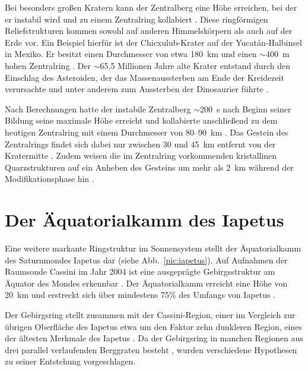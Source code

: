 \documentclass[a4paper,11pt]{article}
\newcommand{\mysection}[1]{\section{#1}\label{sec:#1}}
\begin{document}
Bei besonders großen Kratern kann der Zentralberg eine Höhe erreichen, bei der er instabil wird und
zu einem Zentralring kollabiert \parencite[115]{Rae_2018}.
Diese ringförmigen Reliefstrukturen kommen sowohl auf anderen Himmelskörpern als auch auf der Erde vor.
Ein Beispiel hierfür ist der Chicxulub-Krater auf der Yucatán-Halbinsel in Mexiko.
Er besitzt einen Durchmesser von etwa 180~km und einen $\sim$400~m hohen Zentralring \parencite[100]{Rae_2018}.
Der $\sim$65,5 Millionen Jahre alte Krater entstand durch
den Einschlag des Asteroiden, der das Massenaussterben am Ende der Kreidezeit verursachte und
unter anderem zum Aussterben der Dinosaurier führte \parencite[1214]{Schulte_2010}.

Nach Berechnungen hatte der instabile Zentralberg $\sim$200~s nach Beginn seiner Bildung seine maximale Höhe erreicht und
kollabierte anschließend zu dem heutigen Zentralring mit einem Durchmesser von 80--90~km \parencite[100, 113]{Rae_2018}.
Das Gestein des Zentralrings findet sich dabei nur zwischen 30 und 45~km entfernt von der Kratermitte \parencite[113]{Rae_2018}.
Zudem weisen die im Zentralring vorkommenden kristallinen Quarzstrukturen auf ein Anheben des
Gesteins um mehr als 2~km während der Modifikationsphase hin \parencite[102~f.]{Rae_2018}.







\mysection{Der Äquatorialkamm des Iapetus}

Eine weitere markante Ringstruktur im Sonnensystem stellt der Äquatorialkamm des Saturnmondes Iapetus
dar (siehe Abb.~\ref{pic:iapetus}).
Auf Aufnahmen der Raumsonde Cassini im Jahr 2004 ist eine
ausgeprägte Gebirgsstruktur am Äquator des Mondes erkennbar \parencite[1237, 1241]{Porco_2005}.
Der Äquatorialkamm erreicht eine Höhe von 20~km und erstreckt sich über
mindestens 75\% des Umfangs von Iapetus \parencites[2262]{Dombard_2008}[1241]{Porco_2005}.

Der Gebirgsring stellt zusammen mit der Cassini-Region, einer im Vergleich zur übrigen Oberfläche des Iapetus
etwa um den Faktor zehn dunkleren Region,
eines der ältesten Merkmale des Iapetus \parencites[361]{Giese_2008}[1242]{Porco_2005}.
Da der Gebirgsring in manchen Regionen aus drei parallel verlaufenden Berggraten besteht \parencite[1242]{Porco_2005},
wurden verschiedene Hypothesen zu seiner Entstehung vorgeschlagen.
\end{document}
